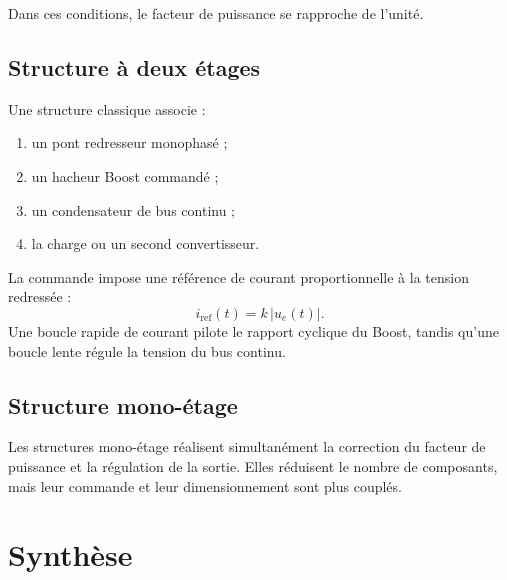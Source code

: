 Dans ces conditions, le facteur de puissance se rapproche de l'unité.

\subsection{Structure à deux étages}

Une structure classique associe :
\begin{enumerate}
\item un pont redresseur monophasé ;
\item un hacheur Boost commandé ;
\item un condensateur de bus continu ;
\item la charge ou un second convertisseur.
\end{enumerate}

\begin{center}
\end{center}

La commande impose une référence de courant proportionnelle à la tension redressée :
\[
i_{\mathrm{ref}}(t)=k\,|u_e(t)|.
\]
Une boucle rapide de courant pilote le rapport cyclique du Boost, tandis qu'une boucle lente régule la tension du bus continu.

\subsection{Structure mono-étage}

Les structures mono-étage réalisent simultanément la correction du facteur de puissance et la régulation de la sortie. Elles réduisent le nombre de composants, mais leur commande et leur dimensionnement sont plus couplés.

\section{Synthèse}

